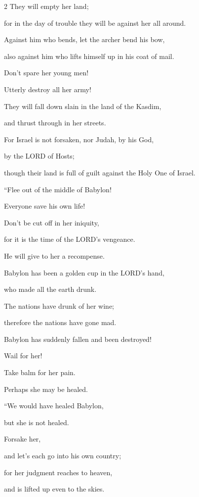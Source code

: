 \begin{multicols}{2}
They will empty her land;

for in the day of trouble they will be against her all around.


\myverse{}Against him who bends, let the archer bend his bow,

also against him who lifts himself up in his coat of mail.

Don’t spare her young men!

Utterly destroy all her army!


\myverse{}They will fall down slain in the land of the Kasdim,

and thrust through in her streets.


\myverse{}For Israel is not forsaken, nor Judah, by his God,

by the LORD of Hosts;

though their land is full of guilt against the Holy One of Israel.

\vspace{\baselineskip}

\myverse{}“Flee out of the middle of Babylon!

Everyone save his own life!

Don’t be cut off in her iniquity,

for it is the time of the LORD’s vengeance.

He will give to her a recompense.


\myverse{}Babylon has been a golden cup in the LORD’s hand,

who made all the earth drunk.

The nations have drunk of her wine;

therefore the nations have gone mad.


\myverse{}Babylon has suddenly fallen and been destroyed!

Wail for her!

Take balm for her pain.

Perhaps she may be healed.

\vspace{\baselineskip}

\myverse{}“We would have healed Babylon,

but she is not healed.

Forsake her,

and let’s each go into his own country;

for her judgment reaches to heaven,

and is lifted up even to the skies.



\end{multicols}
